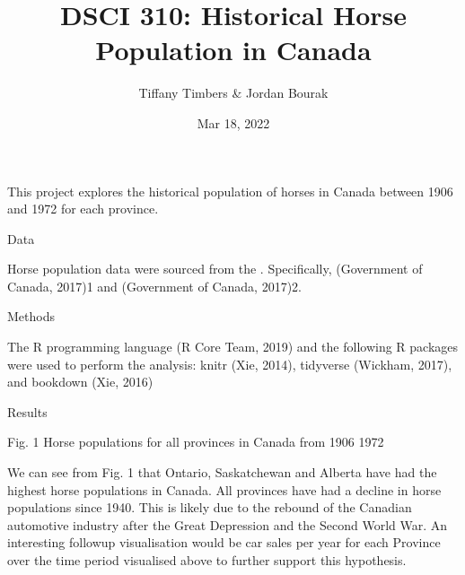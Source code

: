 \documentclass[letterpaper,10pt,english]{jupyterBook}
\title{DSCI 310: Historical Horse Population in Canada}
\date{Mar 18, 2022}
\author{Tiffany Timbers \& Jordan Bourak}
\begin{document}
\pagestyle{empty}
\sphinxmaketitle
\pagestyle{plain}
\sphinxtableofcontents
\pagestyle{normal}
\label{\detokenize{jbook_example::doc}}


\sphinxAtStartPar
This project explores the historical population of horses in Canada
between 1906 and 1972 for each province.

\sphinxAtStartPar
Data

\sphinxAtStartPar
Horse population data were sourced from the .
Specifically, (Government of Canada, 2017)1 and (Government of Canada, 2017)2.

\sphinxAtStartPar
Methods

\sphinxAtStartPar
The R programming language (R Core Team, 2019) and the following R packages were used
to perform the analysis: knitr (Xie, 2014), tidyverse (Wickham, 2017), and
bookdown (Xie, 2016)

\sphinxAtStartPar
Results

\begin{figure}[htbp]
\centering

\noindent{}
\end{figure}

\sphinxAtStartPar
Fig. 1 Horse populations for all provinces in Canada from 1906 \sphinxhyphen{} 1972

\sphinxAtStartPar
We can see from Fig. 1
that Ontario, Saskatchewan and Alberta have had the highest horse populations in Canada.
All provinces have had a decline in horse populations since 1940.
This is likely due to the rebound of the Canadian automotive
industry after the Great Depression and the Second World War.
An interesting follow\sphinxhyphen{}up visualisation would be car sales per year for each
Province over the time period visualised above to further support this hypothesis.
\end{document}
